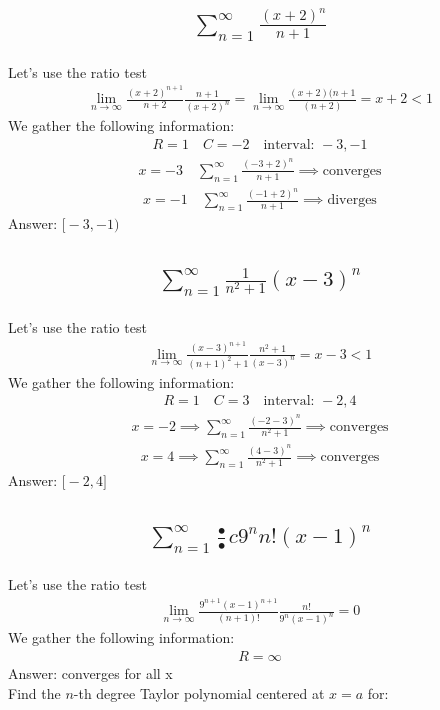 \documentclass{article}
\begin{document}
\subsection{
	\begin{align*}
		\sum_{n = 1}^{\infty} \frac{(x + 2)^n}{n + 1}
	\end{align*}
}
Let's use the ratio test
\begin{align*}
	\lim_{n \to \infty} {\frac{(x + 2)^{n + 1}}{n + 2} \frac{n + 1}{(x + 2)^n}} = \lim_{n \to \infty} {\frac{(x + 2)(n + 1}{(n + 2)}} = x + 2 < 1
\end{align*}
We gather the following information:
\begin{align*}
	R = 1 \quad C = -2 \quad \text{interval: } -3, -1
\end{align*}
\begin{align*}
	x = -3 \quad \sum_{n = 1}^{\infty} {\frac{(-3 + 2)^n}{n + 1}} \implies \text{converges}
\end{align*}
\begin{align*}
	x = -1 \quad \sum_{n = 1}^{\infty} {\frac{(-1 + 2)^n}{n + 1}} \implies \text{diverges}
\end{align*}
Answer: $\bigg[ -3, -1 \bigg)$

\subsection{
	\begin{align*}
		\sum_{n = 1}^{\infty} \frac{1}{n^2 + 1} (x - 3)^n
	\end{align*}
}
Let's use the ratio test
\begin{align*}
	\lim_{n \to \infty} {\frac{(x - 3)^{n +1}}{(n + 1)^2 + 1} \frac{n^2 + 1}{(x - 3)^n}} = x - 3 < 1
\end{align*}
We gather the following information:
\begin{align*}
	R = 1 \quad C = 3 \quad \text{interval: } -2, 4
\end{align*}
\begin{align*}
	x = -2 \implies \sum_{n = 1}^{\infty} {\frac{(-2 - 3)^n}{n^2 + 1}} \implies \text{converges}
\end{align*}
\begin{align*}
	x = 4 \implies \sum_{n = 1}^{\infty} {\frac{(4 - 3)^n}{n^2 + 1}} \implies \text{converges}
\end{align*}
Answer: $\bigg[ -2, 4 \bigg]$

\subsection{
	\begin{align*}
		\sum_{n = 1}^{\infty} \frac{•}{•}c{9^n}{n!} (x - 1)^n
	\end{align*}
}
Let's use the ratio test
\begin{align*}
	\lim_{n \to \infty} {\frac{9^{n + 1} (x - 1)^{n + 1} }{(n + 1)!} \frac{n!}{9^n (x - 1)^n}} = 0
\end{align*}
We gather the following information:
\begin{align*}
	R = \infty
\end{align*}
Answer: converges for all x \\[10pt]
Find the $n$-th degree Taylor polynomial centered at $x = a$ for:
\end{document}
